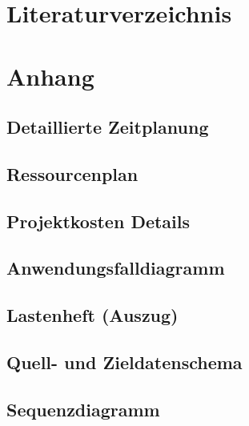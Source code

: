 \documentclass[11pt,toc=sectionentrywithoutdots, headheight=44pt, headings=optiontoheadandtoc]{scrartcl}
\begin{document}
\newpage
\setcounter{secnumdepth}{0}
\section{Literaturverzeichnis}
\blindtext\label{myLastPage}

\newpage


\setcounter{page}{1}
\setcounter{secnumdepth}{2}
\setcounter{section}{1}
\renewcommand{\thesection}{A}


\ofoot{\thepage}




\section{Anhang}
\subsection{Detaillierte Zeitplanung}
\blindtext

\subsection{Ressourcenplan}
\blindtext\blindtext

\subsection{Projektkosten Details}
\blindtext\blindtext

\subsection{Anwendungsfalldiagramm}
\blindtext\blindtext

\subsection{Lastenheft (Auszug)}
\blindtext\blindtext

\subsection{Quell- und Zieldatenschema}
\blindtext\blindtext

\subsection{Sequenzdiagramm}
\blindtext\blindtext
\end{document}
